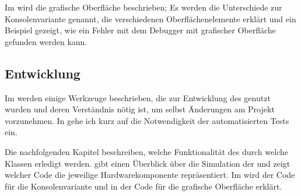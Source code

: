 Im  wird die grafische Oberfläche beschrieben; Es werden die Unterschiede zur Konsolenvariante genannt, die verschiedenen Oberflächenelemente erklärt und ein Beispiel gezeigt, wie ein Fehler mit dem Debugger mit grafischer Oberfläche gefunden werden kann.

\subsection*{Entwicklung}
Im  werden einige Werkzeuge beschrieben, die zur Entwicklung des \md genutzt wurden und deren Verständnis nötig ist, um selbst Änderungen am Projekt vorzunehmen. In  gehe ich kurz auf die Notwendigkeit der automatisierten Tests ein.

Die nachfolgenden Kapitel beschreiben, welche Funktionalität des \md durch welche Klassen erledigt werden.  gibt einen Überblick über die Simulation der \mic und zeigt welcher Code die jeweilige Hardwarekomponente repräsentiert. Im  wird der Code für die Konsolenvariante und in  der Code für die grafische Oberfläche erklärt.